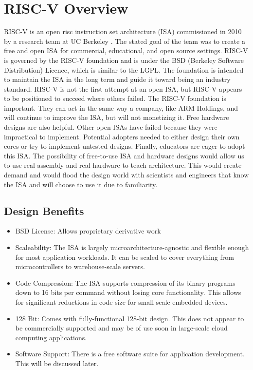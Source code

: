 \documentclass[journal]{IEEEtran}
\begin{document}
\section{RISC-V Overview}
RISC-V is an open risc instruction set architecture (ISA) commissioned in 2010 by a research team at UC Berkeley \cite{Waterman:EECS-2016-118}. The stated goal of the team was to create a free and open ISA for commercial, educational, and open source settings. RISC-V is governed by the RISC-V foundation and is under the BSD (Berkeley Software Distribution) Licence, which is similar to the LGPL. The foundation is intended to maintain the ISA in the long term and guide it toward being an industry standard.\newline
RISC-V is not the first attempt at an open ISA, but RISC-V appears to be positioned to succeed where others failed. The RISC-V foundation is important. They can act in the same way a company, like ARM Holdings, and will continue to improve the ISA, but will not monetizing it. Free hardware designs are also helpful. Other open ISAs have failed because they were impractical to implement. Potential adopters needed to either design their own cores or try to implement untested designs. Finally, educators are eager to adopt this ISA. The possibility of free-to-use ISA and hardware designs would allow us to use real assembly and real hardware to teach architecture. This would create demand and would flood the design world with scientists and engineers that know the ISA and will choose to use it due to familiarity.

\subsection{Design Benefits}
\begin{itemize}
\item BSD License:\newline
  Allows proprietary derivative work
\item Scaleability:\newline
  The ISA is largely microarchitecture-agnostic and flexible enough for most application workloads. It can be scaled to cover everything from microcontrollers to warehouse-scale servers.
\item Code Compression:\newline
  The ISA supports compression of its binary programs down to 16 bits per command without losing core functionality. This allows for significant reductions in code size for small scale embedded devices.
\item 128 Bit:\newline
  Comes with fully-functional 128-bit design. This does not appear to be commercially supported and may be of use soon in large-scale cloud computing applications.
\item Software Support:\newline
  There is a free software suite for application development. This will be discussed later.
\end{itemize}
\end{document}
